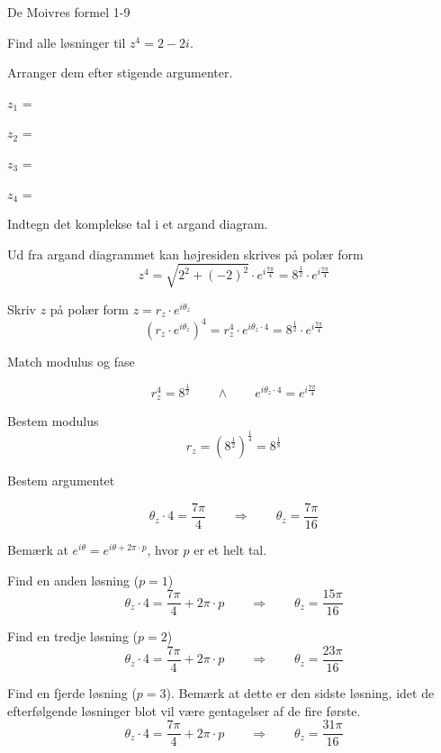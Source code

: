 \documentclass{article}
\begin{document}
\begin{exercise}{De Moivres formel 1-9}

Find alle løsninger til $z^4=2-2i$. 

Arranger dem efter stigende argumenter.

$z_1$ = 		

$z_2$ = 		

$z_3$ = 		

$z_4$ = 


\hint 

Indtegn det komplekse tal i et argand diagram. 

\hint 

Ud fra argand diagrammet kan højresiden skrives på polær form
\[
z^4 = \sqrt{2^2+(-2)^2} \cdot e^{i \frac{7 \pi}{4}} = 8^{\frac{1}{2}} \cdot e^{i \frac{7 \pi}{4}} 
\]


\hint

Skriv $z$ på polær form $z = r_z \cdot e^{i \theta_z}$
\[
\left(r_z \cdot e^{i \theta_z}\right)^4 = r_z^4 \cdot e^{i \theta_z \cdot 4} = 8^{\frac{1}{2}} \cdot e^{i \frac{7 \pi}{4}} 
\]

\hint 
Match modulus og fase

\[
r_z^4 = 8^{\frac{1}{2}} \qquad \wedge \qquad e^{i \theta_z \cdot 4} = e^{i \frac{7 \pi}{4}} 
\]

\hint

Bestem modulus
\[
r_z  =  \left(8^{\frac{1}{2}} \right)^{\frac{1}{4}} = 8^{\frac{1}{8}}
\]

\hint

Bestem argumentet

\[
\theta_z \cdot 4 = \frac{7 \pi}{4} \qquad \Rightarrow \qquad  \theta_z = \frac{7\pi}{16}
\]

\hint

Bemærk at $e^{i \theta} = e^{i \theta + 2 \pi \cdot p}$, hvor $p$ er et helt tal.

\hint

Find en anden løsning ($p=1$)
\[
\theta_z \cdot 4 = \frac{7\pi}{4}  + 2 \pi \cdot p \qquad \Rightarrow \qquad  \theta_z = \frac{15 \pi}{16}
\]

\hint

Find en tredje løsning ($p=2$)
\[
\theta_z \cdot 4 = \frac{7\pi}{4}   + 2 \pi \cdot p \qquad \Rightarrow  \qquad  \theta_z = \frac{23 \pi}{16}
\]

\hint

Find en fjerde løsning ($p=3$). 
Bemærk at dette er den sidste løsning, idet de efterfølgende 
løsninger blot vil være gentagelser af de fire første. 
\[
\theta_z \cdot 4 = \frac{7\pi}{4}  + 2 \pi \cdot p \qquad \Rightarrow  \qquad  \theta_z = \frac{31 \pi}{16}
\]

\end{exercise}
\end{document}
